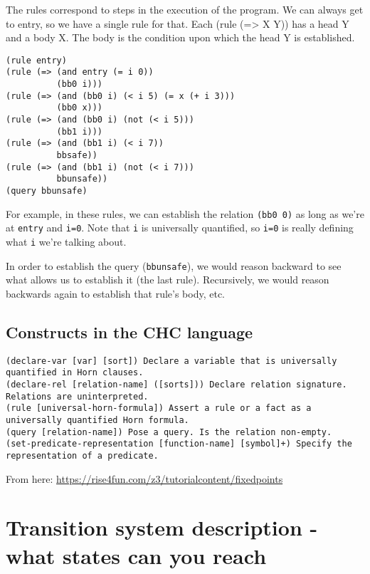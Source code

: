 \documentclass{article}
\begin{document}
The rules correspond to steps in the execution of the program. We can
always get to entry, so we have a single rule for that. Each (rule
(=\textgreater{} X Y)) has a head Y and a body X. The body is the
condition upon which the head Y is established.

\begin{verbatim}
(rule entry)
(rule (=> (and entry (= i 0))
          (bb0 i)))
(rule (=> (and (bb0 i) (< i 5) (= x (+ i 3)))
          (bb0 x)))
(rule (=> (and (bb0 i) (not (< i 5)))
          (bb1 i)))
(rule (=> (and (bb1 i) (< i 7))
          bbsafe))
(rule (=> (and (bb1 i) (not (< i 7)))
          bbunsafe))
(query bbunsafe)
\end{verbatim}

For example, in these rules, we can establish the relation
\texttt{(bb0\ 0)} as long as we're at \texttt{entry} and \texttt{i=0}.
Note that \texttt{i} is universally quantified, so \texttt{i=0} is
really defining what \texttt{i} we're talking about.

In order to establish the query (\texttt{bbunsafe}), we would reason
backward to see what allows us to establish it (the last rule).
Recursively, we would reason backwards again to establish that rule's
body, etc.

\hypertarget{constructs-in-the-chc-language}{%
\subsection{Constructs in the CHC
language}\label{constructs-in-the-chc-language}}

\begin{verbatim}
(declare-var [var] [sort]) Declare a variable that is universally quantified in Horn clauses.
(declare-rel [relation-name] ([sorts])) Declare relation signature. Relations are uninterpreted.
(rule [universal-horn-formula]) Assert a rule or a fact as a universally quantified Horn formula.
(query [relation-name]) Pose a query. Is the relation non-empty.
(set-predicate-representation [function-name] [symbol]+) Specify the representation of a predicate.
\end{verbatim}

From here: \url{https://rise4fun.com/z3/tutorialcontent/fixedpoints}

\hypertarget{transition-system-description---what-states-can-you-reach}{%
\section{Transition system description - what states can you
reach}\label{transition-system-description---what-states-can-you-reach}}
\end{document}
